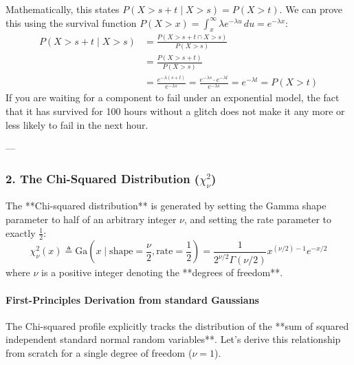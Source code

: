 \documentclass{article}
\begin{document}
Mathematically, this states $P(X > s + t \mid X > s) = P(X > t)$. We can prove this using the survival function $P(X > x) = \int_{x}^{\infty} \lambda e^{-\lambda u} \, du = e^{-\lambda x}$:
\begin{align*}
P(X > s + t \mid X > s) &= \frac{P(X > s + t \cap X > s)}{P(X > s)} \\
&= \frac{P(X > s + t)}{P(X > s)} \\
&= \frac{e^{-\lambda(s + t)}}{e^{-\lambda s}} = \frac{e^{-\lambda s} \cdot e^{-\lambda t}}{e^{-\lambda s}} = e^{-\lambda t} = P(X > t)
\end{align*}
If you are waiting for a component to fail under an exponential model, the fact that it has survived for 100 hours without a glitch does not make it any more or less likely to fail in the next hour.

---

\subsubsection*{2. The Chi-Squared Distribution ($\chi^2_\nu$)}

The **Chi-squared distribution** is generated by setting the Gamma shape parameter to half of an arbitrary integer $\nu$, and setting the rate parameter to exactly $\frac{1}{2}$:
\begin{equation}
\chi^2_\nu(x) \triangleq \text{Ga}\left(x \mid \text{shape} = \frac{\nu}{2}, \text{rate} = \frac{1}{2}\right) = \frac{1}{2^{\nu/2}\Gamma(\nu/2)} x^{(\nu/2)-1} e^{-x/2} \tag{205}
\end{equation}
where $\nu$ is a positive integer denoting the **degrees of freedom**. 

\paragraph{First-Principles Derivation from standard Gaussians}
The Chi-squared profile explicitly tracks the distribution of the **sum of squared independent standard normal random variables**. Let's derive this relationship from scratch for a single degree of freedom ($\nu = 1$).
\end{document}
